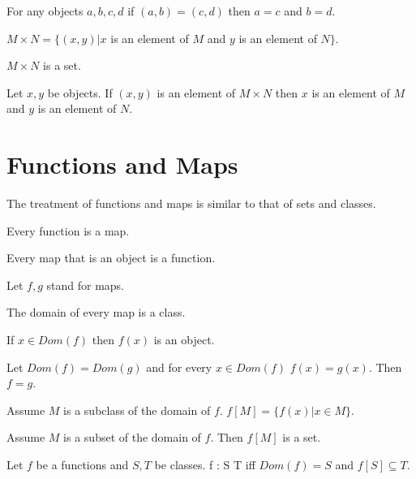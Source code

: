 \documentclass[11pt]{article}
\begin{document}
\begin{forthel}
\begin{axiom}
For any objects $a,b,c,d$ if $(a,b) = (c,d)$ then $a = c$
and $b = d$.
\end{axiom}

\begin{definition}
$M \times N = \{(x,y) | x$ is an element of $M$ and $y$
is an element of $N\}$.
\end{definition}

\begin{axiom}
$M \times N$ is a set.
\end{axiom}

\begin{lemma}
Let $x,y$ be objects.
If $(x,y)$ is an element of $M \times N$ then $x$ is an
element of $M$ and $y$ is an element of $N$.
\end{lemma}

\end{forthel}
\section{Functions and Maps}
The treatment of functions and maps is similar to that
of sets and classes.
\begin{forthel}

\begin{lemma} Every function is a map.
\end{lemma}

\begin{lemma} Every map that is an object is a function.
\end{lemma}

Let $f,g$ stand for maps.

\begin{lemma} The domain of every map is a class.
\end{lemma}

\begin{lemma} If $x \in Dom(f)$ then $f(x)$ is an object.
\end{lemma}

\begin{lemma}  Let $Dom(f)=Dom(g)$ and for every $x \in Dom(f)$
$f(x)=g(x)$. Then $f=g$.
\end{lemma}

\begin{definition}
Assume $M$ is a subclass of the domain of $f$.
$f[M] = \{ f(x) | x \in M \}$.
\end{definition}

\begin{axiom} 
Assume $M$ is a subset of the domain of $f$.
Then $f[M]$ is a set.
\end{axiom}

\begin{definition} Let $f$ be a functions and $S,T$ be classes.
f : S \rightarrow T iff $Dom (f) = S$ and $f[S] \subseteq T$.
\end{definition}

\end{forthel}
\end{document}
